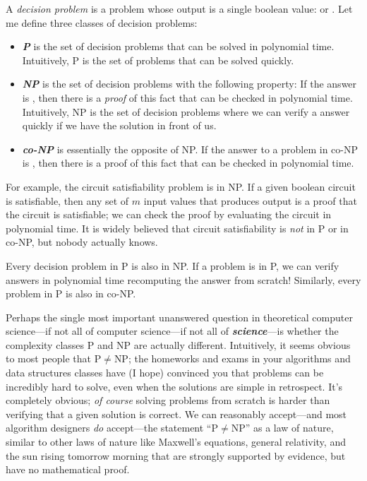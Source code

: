 A \textit{decision problem} is a problem whose output is a single boolean value:  or .
Let me define three classes of decision problems:
\begin{itemize}
\item \textbf{\textit{P}} is the set of decision problems that can be solved in polynomial time.
Intuitively, P is the set of problems that can be solved quickly.
\item \textbf{\textit{NP}} is the set of decision problems with the following property: If the answer is , then there is a \textit{proof} of this fact that can be checked in polynomial time.
Intuitively, NP is the set of decision problems where we can verify a  answer quickly if we have the solution in front of us.
\item \textbf{\textit{co-NP}} is essentially the opposite of NP.
If the answer to a problem in co-NP is , then there is a proof of this fact that can be checked in polynomial time.
\end{itemize}
For example, the circuit satisfiability problem is in NP.
If a given boolean circuit is satisfiable, then any set of $m$ input values that produces  output is a proof that the circuit is satisfiable; we can check the proof by evaluating the circuit in polynomial time.
It is widely believed that circuit satisfiability is \textit{not} in P or in co-NP, but nobody actually knows.

Every decision problem in P is also in NP.
If a problem is in P, we can verify  answers in polynomial time recomputing the answer from scratch!
Similarly, every problem in P is also in co-NP.

Perhaps the single most important unanswered question in theoretical computer science---if not all of computer science---if not all of \textbf{\textit{science}}---is whether the complexity classes P and NP are actually different.
Intuitively, it seems obvious to most people that P${}\neq{}$NP; the homeworks and exams in your algorithms and data structures classes have (I hope) convinced you that problems can be incredibly hard to solve, even when the solutions are simple in retrospect.
It’s completely obvious; \textit{of course} solving problems from scratch is harder than verifying that a given solution is correct.
We can reasonably accept---and most algorithm designers \textit{do} accept---the statement “P${}\neq{}$NP” as a law of nature, similar to other laws of nature like Maxwell’s equations, general relativity, and the sun rising tomorrow morning that are strongly supported by evidence, but have no mathematical proof.

